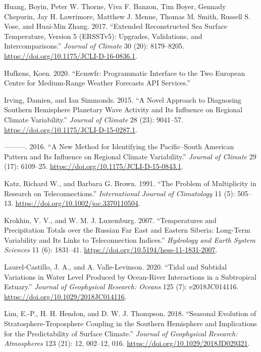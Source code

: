 \documentclass[smallextended]{svjour3}       %
\newlength{\cslhangindent}
\newlength{\cslentryspacingunit} %
\newenvironment{CSLReferences}[2] %
 {%
  \setlength{\parindent}{0pt}
  \ifodd #1
  \let\oldpar\par
  \def\par{\hangindent=\cslhangindent\oldpar}
  \fi
  \setlength{\parskip}{#2\cslentryspacingunit}
 }%
 {}
\begin{document}
\begin{CSLReferences}{1}{0}
\leavevmode{}%
Huang, Boyin, Peter W. Thorne, Viva F. Banzon, Tim Boyer, Gennady Chepurin, Jay H. Lawrimore, Matthew J. Menne, Thomas M. Smith, Russell S. Vose, and Huai-Min Zhang. 2017. {``Extended {Reconstructed Sea Surface Temperature}, {Version} 5 ({ERSSTv5}): {Upgrades}, {Validations}, and {Intercomparisons}.''} \emph{Journal of Climate} 30 (20): 8179--8205. \url{https://doi.org/10.1175/JCLI-D-16-0836.1}.

\leavevmode{}%
Hufkens, Koen. 2020. {``Ecmwfr: {Programmatic} Interface to the Two {European Centre} for {Medium-Range Weather Forecasts API} Services.''}

\leavevmode{}%
Irving, Damien, and Ian Simmonds. 2015. {``A {Novel Approach} to {Diagnosing Southern Hemisphere Planetary Wave Activity} and {Its Influence} on {Regional Climate Variability}.''} \emph{Journal of Climate} 28 (23): 9041--57. \url{https://doi.org/10.1175/JCLI-D-15-0287.1}.

\leavevmode{}%
---------. 2016. {``A {New Method} for {Identifying} the {Pacific}--{South American Pattern} and {Its Influence} on {Regional Climate Variability}.''} \emph{Journal of Climate} 29 (17): 6109--25. \url{https://doi.org/10.1175/JCLI-D-15-0843.1}.

\leavevmode{}%
Katz, Richard W., and Barbara G. Brown. 1991. {``The Problem of Multiplicity in Research on Teleconnections.''} \emph{International Journal of Climatology} 11 (5): 505--13. \url{https://doi.org/10.1002/joc.3370110504}.

\leavevmode{}%
Krokhin, V. V., and W. M. J. Luxemburg. 2007. {``Temperatures and Precipitation Totals over the {Russian Far East} and {Eastern Siberia}: Long-Term Variability and Its Links to Teleconnection Indices.''} \emph{Hydrology and Earth System Sciences} 11 (6): 1831--41. \url{https://doi.org/10.5194/hess-11-1831-2007}.

\leavevmode{}%
Laurel-Castillo, J. A., and A. Valle-Levinson. 2020. {``Tidal and {Subtidal Variations} in {Water Level Produced} by {Ocean-River Interactions} in a {Subtropical Estuary}.''} \emph{Journal of Geophysical Research: Oceans} 125 (7): e2018JC014116. \url{https://doi.org/10.1029/2018JC014116}.

\leavevmode{}%
Lim, E.-P., H. H. Hendon, and D. W. J. Thompson. 2018. {``Seasonal {Evolution} of {Stratosphere-Troposphere Coupling} in the {Southern Hemisphere} and {Implications} for the {Predictability} of {Surface Climate}.''} \emph{Journal of Geophysical Research: Atmospheres} 123 (21): 12, 002--12, 016. \url{https://doi.org/10.1029/2018JD029321}.


\end{CSLReferences}
\end{document}
